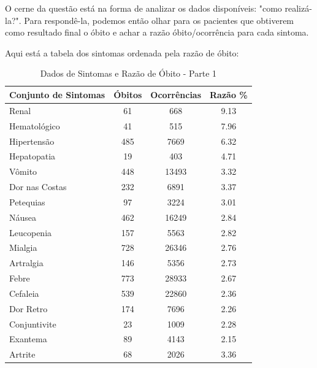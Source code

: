 \documentclass[a4paper,12pt]{article}
\begin{document}
O cerne da questão está na forma de analizar os dados disponíveis: "como realizá-la?". Para respondê-la, podemos então olhar para os pacientes que obtiverem como resultado final o óbito e achar a razão óbito/ocorrência para cada sintoma. 

Aqui está a tabela dos sintomas ordenada pela razão de óbito:

\begin{table}[H]
    \centering
    \caption{Dados de Sintomas e Razão de Óbito - Parte 1}
    \begin{tabular}{@{}lccc@{}}
        \toprule
        \textbf{Conjunto de Sintomas} & \textbf{Óbitos} & \textbf{Ocorrências} & \textbf{Razão \%} \\ 
        \midrule
        Renal & 61 & 668 & 9.13 \\
        Hematológico & 41 & 515 & 7.96 \\
        Hipertensão & 485 & 7669 & 6.32 \\
        Hepatopatia & 19 & 403 & 4.71 \\
        Vômito & 448 & 13493 & 3.32 \\
        Dor nas Costas & 232 & 6891 & 3.37 \\
        Petequias & 97 & 3224 & 3.01 \\
        Náusea & 462 & 16249 & 2.84 \\
        Leucopenia & 157 & 5563 & 2.82 \\
        Mialgia & 728 & 26346 & 2.76 \\
        Artralgia & 146 & 5356 & 2.73 \\
        Febre & 773 & 28933 & 2.67 \\
        Cefaleia & 539 & 22860 & 2.36 \\
        Dor Retro & 174 & 7696 & 2.26 \\
        Conjuntivite & 23 & 1009 & 2.28 \\
        Exantema & 89 & 4143 & 2.15 \\
        Artrite & 68 & 2026 & 3.36 \\ 
        \bottomrule
    \end{tabular}
    \label{tab:symptom_data_1}
\end{table}
\end{document}
